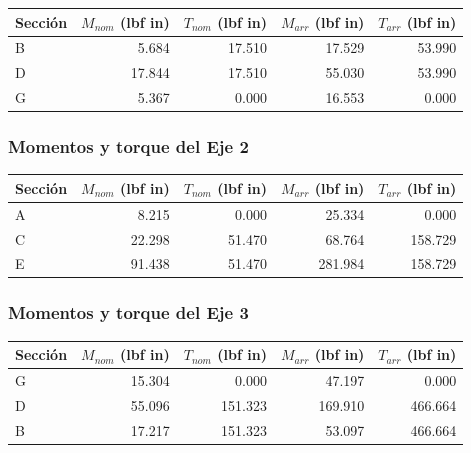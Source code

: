\documentclass[11pt,a4paper]{article}
\begin{document}
\begin{center}\small\begin{tabular}{lrrrr}\toprule

Sección & $M_{nom}$ (lbf in) & $T_{nom}$ (lbf in) & $M_{arr}$ (lbf in) & $T_{arr}$ (lbf in) \\ \midrule

B & 5.684 & 17.510 & 17.529 & 53.990 \\

D & 17.844 & 17.510 & 55.030 & 53.990 \\

G & 5.367 & 0.000 & 16.553 & 0.000 \\

\bottomrule\end{tabular}\end{center}

\subsubsection*{Momentos y torque del Eje 2}

\begin{center}\small\begin{tabular}{lrrrr}\toprule

Sección & $M_{nom}$ (lbf in) & $T_{nom}$ (lbf in) & $M_{arr}$ (lbf in) & $T_{arr}$ (lbf in) \\ \midrule

A & 8.215 & 0.000 & 25.334 & 0.000 \\

C & 22.298 & 51.470 & 68.764 & 158.729 \\

E & 91.438 & 51.470 & 281.984 & 158.729 \\

\bottomrule\end{tabular}\end{center}

\subsubsection*{Momentos y torque del Eje 3}

\begin{center}\small\begin{tabular}{lrrrr}\toprule

Sección & $M_{nom}$ (lbf in) & $T_{nom}$ (lbf in) & $M_{arr}$ (lbf in) & $T_{arr}$ (lbf in) \\ \midrule

G & 15.304 & 0.000 & 47.197 & 0.000 \\

D & 55.096 & 151.323 & 169.910 & 466.664 \\

B & 17.217 & 151.323 & 53.097 & 466.664 \\

\bottomrule\end{tabular}\end{center}
\end{document}
